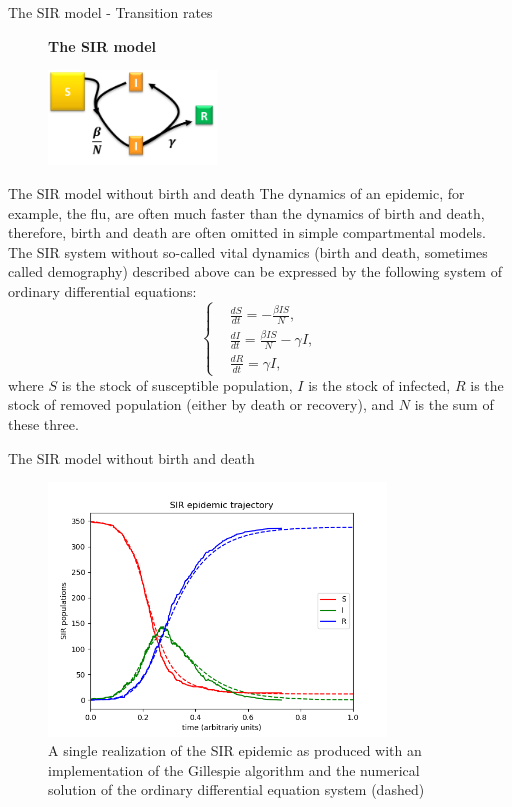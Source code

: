 \documentclass[
  notheorems,
  aspectratio=54,
]{beamer}
\begin{document}
\begin{frame}{The SIR model - Transition rates}
  \begin{figure}
    \centering
    \textbf{The SIR model}\par\medskip
    \includegraphics[width=0.4\textwidth]{440px-SIR_model_cartoon.png}
  \end{figure}
\end{frame}


\begin{frame}{The SIR model without birth and death}
  The dynamics of an epidemic, for example, the flu, are often much faster than the dynamics of birth and death, therefore, birth and death are often omitted in simple compartmental models. The SIR system without so-called vital dynamics (birth and death, sometimes called demography) described above can be expressed by the following system of ordinary differential equations:
  $${\displaystyle \left\{{\begin{aligned}&{\frac {dS}{dt}}=-{\frac {\beta IS}{N}},\\[6pt]&{\frac {dI}{dt}}={\frac {\beta IS}{N}}-\gamma I,\\[6pt]&{\frac {dR}{dt}}=\gamma I,\end{aligned}}\right.}$$
    where 
${\displaystyle S}$ is the stock of susceptible population, 
${\displaystyle I}$ is the stock of infected, 
${\displaystyle R}$ is the stock of removed population (either by death or recovery), and
${\displaystyle N}$ is the sum of these three.
\end{frame}

\begin{frame}{The SIR model without birth and death}
  \begin{figure}
    \centering
    \includegraphics[width=0.8\textwidth]{SIR_trajectory.png}
    \caption{A single realization of the SIR epidemic as produced with an implementation of the Gillespie algorithm and the numerical solution of the ordinary differential equation system (dashed)}
  \end{figure}
\end{frame}
\end{document}
